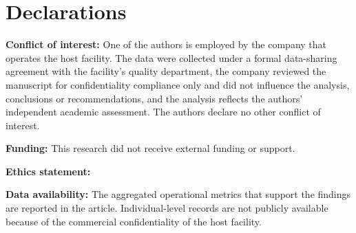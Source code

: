 %
%

\section*{Declarations}

\textbf{Conflict of interest:} One of the authors is employed by the company that operates the host facility. The data were collected under a formal data-sharing agreement with the facility's quality department, the company reviewed the manuscript for confidentiality compliance only and did not influence the analysis, conclusions or recommendations, and the analysis reflects the authors' independent academic assessment. The authors declare no other conflict of interest.

\textbf{Funding:} This research did not receive external funding or support. 

\textbf{Ethics statement:} 

\textbf{Data availability:} The aggregated operational metrics that support the findings are reported in the article. Individual-level records are not publicly available because of the commercial confidentiality of the host facility.
